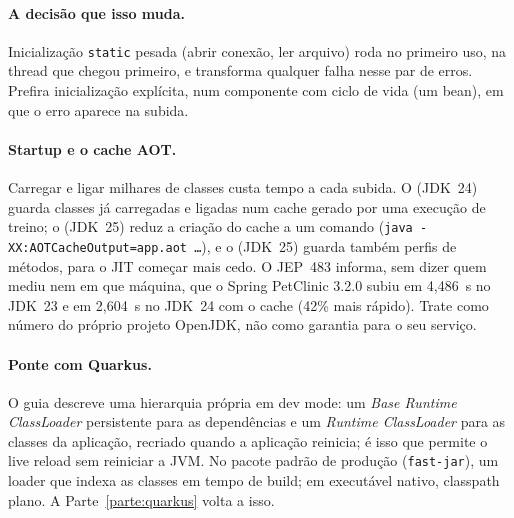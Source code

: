 \paragraph{A decisão que isso muda.}
Inicialização \texttt{static} pesada (abrir conexão, ler arquivo) roda no
primeiro uso, na thread que chegou primeiro, e transforma qualquer falha
nesse par de erros. Prefira inicialização explícita, num componente com
ciclo de vida (um bean), em que o erro aparece na subida.

\paragraph{Startup e o cache AOT.}
Carregar e ligar milhares de classes custa tempo a cada subida. O
 (JDK~24) guarda classes já carregadas e ligadas
num cache  gerado por uma execução de treino; o 
(JDK~25) reduz a criação do cache a um comando
(\texttt{java -XX:AOTCacheOutput=app.aot \ldots}), e o
 (JDK~25) guarda também perfis de métodos, para o
JIT começar mais cedo. O JEP~483 informa, sem dizer quem mediu nem em que
máquina, que o Spring PetClinic 3.2.0 subiu em 4,486~s no JDK~23 e em
2,604~s no JDK~24 com o cache (42\% mais rápido). Trate como número do
próprio projeto OpenJDK, não como garantia para o seu serviço.

\paragraph{Ponte com Quarkus.}
O guia  descreve uma hierarquia
própria em dev mode: um \emph{Base Runtime ClassLoader} persistente para
as dependências e um \emph{Runtime ClassLoader} para as classes da
aplicação, recriado quando a aplicação reinicia; é isso que permite o
live reload sem reiniciar a JVM. No pacote padrão de produção
(\texttt{fast-jar}), um loader que indexa as classes em tempo de build;
em executável nativo, classpath plano. A Parte~\ref{parte:quarkus} volta a isso.
